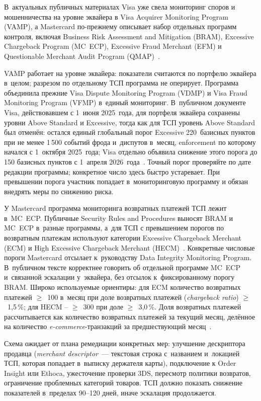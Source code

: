 В~актуальных публичных материалах Visa уже свела мониторинг
споров и мошенничества на уровне эквайера в Visa Acquirer
Monitoring Program (VAMP), а Mastercard по-прежнему описывает
набор отдельных программ контроля, включая Business Risk
Assessment and Mitigation (BRAM), Excessive Chargeback
Program (MC~ECP), Excessive Fraud Merchant (EFM) и Questionable
Merchant Audit Program (QMAP)~\cite{visa-vamp-intro,mc-compliance-programs}.

VAMP работает на уровне эквайера: показатели считаются
по портфелю эквайера в~целом; разрезом по отдельному ТСП программа
не оперирует.
Программа объединила прежние Visa Dispute Monitoring Program
(VDMP) и Visa Fraud Monitoring Program (VFMP) в~единый
мониторинг. В~публичном документе Visa, действовавшем
с 1~июня 2025~года, для портфеля эквайера сохранены уровни
Above Standard и Excessive, тогда как для ТСП уровень
Above Standard был отменён: остался единый глобальный
порог Excessive 220~базисных пунктов при не менее 1\,500
событий фрода и~диспутов в~месяц, enforcement по которому
начался с 1~октября 2025~года; Visa отдельно объявила снижение
этого порога до 150 базисных пунктов с 1~апреля 2026~года~\cite{visa-vamp-fact-sheet-2025}.
Точный порог проверяйте по дате редакции
программы; конкретное число здесь быстро устаревает. При превышении
порога участник попадает в~мониторинговую программу и обязан внедрять
меры по снижению риска.

У Mastercard программа мониторинга возвратных платежей ТСП лежит
в~MC~ECP. Публичные Security Rules and Procedures
выносят BRAM и MC~ECP в~разные программы, а~для ТСП с
превышением порогов по возвратным платежам используют категории
Excessive Chargeback Merchant (ECM) и High Excessive
Chargeback Merchant (HECM)~\cite{mc-compliance-programs,mc-spme-2025}.
Конкретные числовые пороги Mastercard отсылает к~руководству
Data Integrity Monitoring Program. В~публичном тексте
корректнее говорить об отдельной программе MC~ECP и~связанной
эскалации у~эквайера, без отсылок к~фиксированному порогу BRAM.
Широко используемые ориентиры: для ECM количество возвратных платежей
$\geq$~100 в~месяц при доле возвратных платежей (\textit{chargeback ratio}) $\geq$~1,5\,\%;
для HECM -- $\geq$~300 при доле $\geq$~3,0\,\%.
Доля возвратных платежей рассчитывается как количество возвратных платежей за текущий
месяц, делённое на количество \textit{e-commerce}-транзакций за
предшествующий месяц~\cite{mc-compliance-programs}.

Схема ожидает от плана ремедиации конкретных мер:
улучшение дескриптора продавца (\textit{merchant descriptor}~---
текстовая строка с~названием и~локацией ТСП, которая попадает в~выписку
держателя карты), подключение к Order Insight или Ethoca,
ужесточение проверки 3DS, пересмотр политики возвратов, ограничение
проблемных категорий товаров. ТСП должно показать снижение
показателей в~пределах 90--120 дней, иначе эскалация продолжается.

